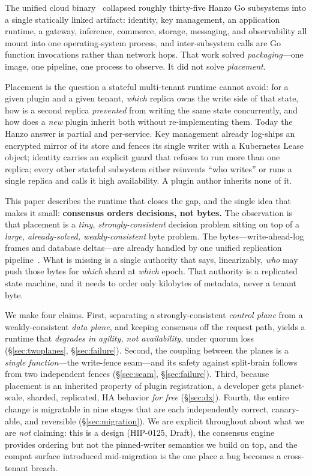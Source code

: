 \documentclass[11pt]{article}
\begin{document}
The unified cloud binary~\cite{hip0106} collapsed roughly thirty-five
Hanzo Go subsystems into a single statically linked artifact: identity, key
management, an application runtime, a gateway, inference, commerce, storage,
messaging, and observability all mount into one operating-system process, and
inter-subsystem calls are Go function invocations rather than network hops.
That work solved \emph{packaging}---one image, one pipeline, one process to
observe. It did not solve \emph{placement}.

Placement is the question a stateful multi-tenant runtime cannot avoid: for a
given plugin and a given tenant, \emph{which} replica owns the write side of
that state, how is a second replica \emph{prevented} from writing the same
state concurrently, and how does a \emph{new} plugin inherit both without
re-implementing them. Today the Hanzo answer is partial and per-service. Key
management already log-ships an encrypted mirror of its store and fences its
single writer with a Kubernetes Lease object; identity carries an explicit
guard that refuses to run more than one replica; every other stateful
subsystem either reinvents ``who writes'' or runs a single replica and calls
it high availability. A plugin author inherits none of it.

This paper describes the runtime that closes the gap, and the single idea
that makes it small: \textbf{consensus orders decisions, not bytes.} The
observation is that placement is a \emph{tiny, strongly-consistent} decision
problem sitting on top of a \emph{large, already-solved, weakly-consistent}
byte problem. The bytes---write-ahead-log frames and database deltas---are
already handled by one unified replication pipeline~\cite{hip0107}. What is
missing is a single authority that says, linearizably, \emph{who} may push
those bytes for \emph{which} shard at \emph{which} epoch. That authority is a
replicated state machine, and it needs to order only kilobytes of metadata,
never a tenant byte.

We make four claims. First, separating a strongly-consistent
\emph{control plane} from a weakly-consistent \emph{data plane}, and keeping
consensus off the request path, yields a runtime that \emph{degrades in
agility, not availability}, under quorum loss (\S\ref{sec:twoplanes},
\S\ref{sec:failure}). Second, the coupling between the planes is a
\emph{single function}---the write-fence seam---and its safety against
split-brain follows from two independent fences (\S\ref{sec:seam},
\S\ref{sec:failure}). Third, because placement is an inherited property of
plugin registration, a developer gets planet-scale, sharded, replicated, HA
behavior \emph{for free} (\S\ref{sec:dx}). Fourth, the entire change is
migratable in nine stages that are each independently correct, canary-able,
and reversible (\S\ref{sec:migration}). We are explicit throughout about
what we are \emph{not} claiming: this is a design (HIP-0125, Draft), the
consensus engine provides ordering but not the pinned-writer semantics we
build on top, and the compat surface introduced mid-migration is the one
place a bug becomes a cross-tenant breach.
\end{document}

